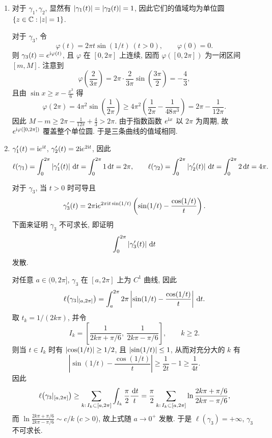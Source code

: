 \documentclass{article}
\begin{document}
\begin{solution}
  \begin{enumerate}[label=(\alph*)]
    \item 对于 \( \gamma_1,\gamma_2 \), 显然有 \( \left|\gamma_1(t)\right|=\left|\gamma_2(t)\right|=1 \), 因此它们的值域均为单位圆 \(\{z\in\mathbb{C}:\left|z\right|=1\}\).

    对于 \( \gamma_3 \), 令
    \[ \varphi(t)=2\pi t\sin(1/t)\ (t>0),\qquad \varphi(0)=0. \]
    则 \( \gamma_3(t)=e^{\mathrm{i}\varphi(t)} \), 且 \( \varphi \) 在 \([0,2\pi]\) 上连续, 因而 \( \varphi([0,2\pi]) \) 为一闭区间 \([m,M]\). 注意到
    \[ \varphi\left(\frac{2}{3\pi}\right)=2\pi\cdot\frac{2}{3\pi}\sin\left(\frac{3\pi}{2}\right)=-\frac{4}{3}, \]
    且由 \( \sin x\ge x-\frac{x^3}{6} \) 得
    \[ \varphi(2\pi)=4\pi^2\sin\left(\frac{1}{2\pi}\right)
    \ge 4\pi^2\left(\frac{1}{2\pi}-\frac{1}{48\pi^3}\right)=2\pi-\frac{1}{12\pi}. \]
    因此 \( M-m\ge 2\pi-\frac{1}{12\pi}+\frac{4}{3}>2\pi \). 由于指数函数 \( e^{\mathrm{i} x} \) 以 \( 2\pi \) 为周期, 故 \( e^{\mathrm{i}\varphi([0,2\pi])} \) 覆盖整个单位圆. 于是三条曲线的值域相同.

    \item \( \gamma_1'(t)=\mathrm{i} e^{\mathrm{i} t} \), \( \gamma_2'(t)=2\mathrm{i} e^{2\mathrm{i} t} \), 因此
    \[ \ell(\gamma_1)=\int_0^{2\pi}\left|\gamma_1'(t)\right|\,\mathrm{d} t=\int_0^{2\pi}1\,\mathrm{d} t=2\pi,\qquad
    \ell(\gamma_2)=\int_0^{2\pi}\left|\gamma_2'(t)\right|\,\mathrm{d} t=\int_0^{2\pi}2\,\mathrm{d} t=4\pi. \]

    对于 \( \gamma_3 \), 当 \( t>0 \) 时可导且
    \[ \gamma_3'(t)=2\pi\mathrm{i} e^{2\pi\mathrm{i} t\sin(1/t)}\left(\sin(1/t)-\frac{\cos(1/t)}{t}\right). \]
    下面来证明 \( \gamma_3 \) 不可求长, 即证明
    \[ \int_{0}^{2\pi}\left|\gamma_3'(t)\right|\,\mathrm{d} t \]
    发散.

    对任意 \( a\in(0,2\pi] \), \( \gamma_3 \) 在 \([a,2\pi]\) 上为 \( C^1 \) 曲线, 因此
    \[ \ell\bigl(\gamma_3|_{[a,2\pi]}\bigr)
    =\int_a^{2\pi}2\pi\left\lvert\sin(1/t)-\frac{\cos(1/t)}{t}\right\rvert\,\mathrm{d} t. \]
    取 \( t_k=1/(2k\pi) \), 并令
    \[ I_k=\left[\frac{1}{2k\pi+\pi/6},\ \frac{1}{2k\pi-\pi/6}\right], \qquad k\ge 2. \]
    则当 \( t\in I_k \) 时有 \( \left|\cos(1/t)\right|\ge 1/2 \), 且 \( \left|\sin(1/t)\right|\le 1 \), 从而对充分大的 \( k \) 有
    \[ \left\lvert\sin(1/t)-\frac{\cos(1/t)}{t}\right\rvert\ge \frac{1}{2t}-1\ge \frac{1}{4t}. \]
    因此
    \[ \ell\bigl(\gamma_3|_{[a,2\pi]}\bigr)
    \ge \sum_{k:\,I_k\subset[a,2\pi]}\int_{I_k}\frac{\pi}{2}\frac{\,\mathrm{d} t}{t}
    =\frac{\pi}{2}\sum_{k:\,I_k\subset[a,2\pi]}\ln\frac{2k\pi+\pi/6}{2k\pi-\pi/6}, \]
    而 \( \ln\frac{2k\pi+\pi/6}{2k\pi-\pi/6}\sim c/k \) (\( c>0 \)), 故上式随 \( a\to 0^+ \) 发散.
    于是 \( \ell(\gamma_3)=+\infty \), \( \gamma_3 \) 不可求长.
  \end{enumerate}
\end{solution}
\end{document}
